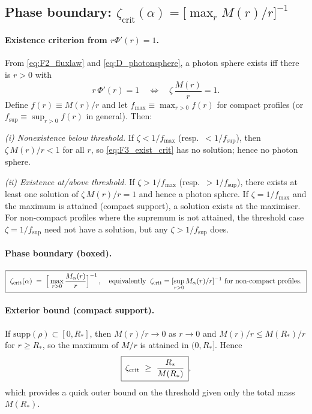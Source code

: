 \documentclass{iopjournal}
\begin{document}
\subsection{\texorpdfstring{Phase boundary: $\zeta_{\mathrm{crit}}(\alpha)=\big[\max_{r} M(r)/r\big]^{-1}$}{Phase boundary: ζcrit(α) = [max over r M(r)/r]⁻¹}}\label{app:F3}

\paragraph{Existence criterion from $r\Phi'(r)=1$.}
From \eqref{eq:F2_fluxlaw} and \eqref{eq:D_photonsphere}, a photon sphere exists iff there is $r>0$ with
\begin{equation}
r\,\Phi'(r)=1
\quad\Longleftrightarrow\quad
\zeta\,\frac{M(r)}{r}=1.
\label{eq:F3_exist_crit}
\end{equation}
Define $f(r)\equiv M(r)/r$ and let $f_{\max}\equiv\max_{r>0} f(r)$ for compact profiles (or $f_{\sup}\equiv \sup_{r>0}f(r)$ in general). Then:

\medskip
\noindent\emph{(i) Nonexistence below threshold.} If $\zeta<1/f_{\max}$ (resp.\ $<1/f_{\sup}$), then $\zeta\,M(r)/r<1$ for all $r$, so \eqref{eq:F3_exist_crit} has no solution; hence no photon sphere.

\noindent\emph{(ii) Existence at/above threshold.}
If $\zeta> 1/f_{\max}$ (resp.\ $>1/f_{\sup}$), there exists at least one solution of $\zeta\,M(r)/r=1$ and hence a photon sphere. If $\zeta=1/f_{\max}$ and the maximum is attained (compact support), a solution exists at the maximiser. For non-compact profiles where the supremum is not attained, the threshold case $\zeta=1/f_{\sup}$ need not have a solution, but any $\zeta>1/f_{\sup}$ does.

\paragraph{Phase boundary (boxed).}
\begin{equation}
\boxed{\ \zeta_{\rm crit}(\alpha)\;=\;\Big[\max_{r>0}\frac{M_\alpha(r)}{r}\Big]^{-1}\,,\quad
\text{equivalently}\;\;\zeta_{\rm crit}=[\sup_{r>0} M_\alpha(r)/r]^{-1}\ \text{for non-compact profiles}.\ }
\label{eq:F3_zeta_crit}
\end{equation}
\paragraph{Exterior bound (compact support).}
If $\mathrm{supp}(\rho)\subset[0,R_\ast]$, then $M(r)/r\to0$ as $r\to0$ and $M(r)/r\le M(R_\ast)/r$ for $r\ge R_\ast$, so the maximum of $M/r$ is attained in $(0,R_\ast]$. Hence
\begin{equation}
\boxed{\,\zeta_{\rm crit}\ \ge\ \frac{R_\ast}{M(R_\ast)}\,},
\label{eq:F3_exterior_bound}
\end{equation}
which provides a quick outer bound on the threshold given only the total mass $M(R_\ast)$.
\end{document}
